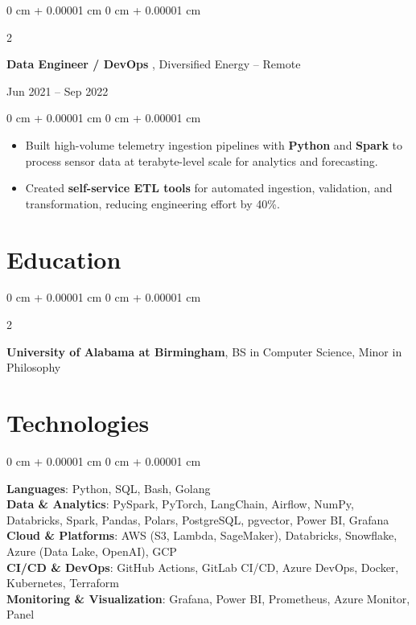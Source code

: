\documentclass[10pt, letterpaper]{article}
\newenvironment{highlights}{
    \begin{itemize}[
        topsep=0.10 cm,
        parsep=0.10 cm,
        partopsep=0pt,
        itemsep=0pt,
        leftmargin=0 cm + 10pt
    ]
}{
    \end{itemize}
} %
\newenvironment{onecolentry}{
    \begin{adjustwidth}{
        0 cm + 0.00001 cm
    }{
        0 cm + 0.00001 cm
    }
}{
    \end{adjustwidth}
} %
\newenvironment{twocolentry}[2][]{
    \onecolentry
    \def\secondColumn{#2}
    \setcolumnwidth{\fill, 3.4 cm}
    \begin{paracol}{2}
}{
    \switchcolumn \raggedleft \secondColumn
    \end{paracol}
    \endonecolentry
} %
\begin{document}
        \begin{twocolentry}{
            Jun 2021 -- Sep 2022
        }


\textbf{Data Engineer / DevOps }, Diversified Energy -- Remote
\end{twocolentry}
\begin{onecolentry}
    \begin{highlights}
        \item Built high-volume telemetry ingestion pipelines with \textbf{Python} and \textbf{Spark} to process sensor data at terabyte-level scale for analytics and forecasting.
        \item Created \textbf{self-service ETL tools} for automated ingestion, validation, and transformation, reducing engineering effort by 40\%.
    \end{highlights}
\end{onecolentry}
\vspace{0.2 cm}


\section{Education}

        \begin{twocolentry}{
        }
            \textbf{University of Alabama at Birmingham}, BS in Computer Science, Minor in Philosophy\end{twocolentry}
        \vspace{0.10 cm}
    \section{Technologies}
\begin{onecolentry}
    \textbf{Languages}: Python, SQL, Bash, Golang \\
    \textbf{Data \& Analytics}: PySpark, PyTorch, LangChain, Airflow, NumPy, Databricks, Spark, Pandas, Polars, PostgreSQL, pgvector, Power BI, Grafana \\
    \textbf{Cloud \& Platforms}: AWS (S3, Lambda, SageMaker), Databricks, Snowflake, Azure (Data Lake, OpenAI), GCP \\
    \textbf{CI/CD \& DevOps}: GitHub Actions, GitLab CI/CD, Azure DevOps, Docker, Kubernetes, Terraform \\
    \textbf{Monitoring \& Visualization}: Grafana, Power BI, Prometheus, Azure Monitor, Panel
\end{onecolentry}
\end{document}
